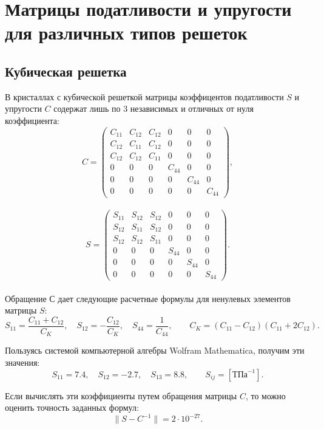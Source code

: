 \documentclass[12pt,a4paper]{article}
\begin{document}
\newpage

\section{Матрицы податливости и упругости для различных типов решеток}

\subsection{Кубическая решетка}

В кристаллах с кубической решеткой матрицы коэффицентов податливости $S$ и упругости $C$ содержат лишь по $3$ независимых и отличных от нуля коэффициента:
\[
    C=
    \begin{pmatrix}
    C_{11} & C_{12} & C_{12} & 0 & 0 & 0\\
    C_{12} & C_{11} & C_{12} & 0 & 0 & 0\\
    C_{12} & C_{12} & C_{11} & 0 & 0 & 0\\
    0 & 0 & 0 & C_{44} & 0 & 0\\
    0 & 0 & 0 & 0 & C_{44} & 0\\
    0 & 0 & 0 & 0 & 0 & C_{44} 
    \end{pmatrix},  
\]
\\
\[
    S=
    \begin{pmatrix}
    S_{11} & S_{12} & S_{12} & 0 & 0 & 0\\
    S_{12} & S_{11} & S_{12} & 0 & 0 & 0\\
    S_{12} & S_{12} & S_{11} & 0 & 0 & 0\\
    0 & 0 & 0 & S_{44} & 0 & 0\\
    0 & 0 & 0 & 0 & S_{44} & 0\\
    0 & 0 & 0 & 0 & 0 & S_{44} 
    \end{pmatrix}.  
\]
\\
Обращение $С$ дает следующие расчетные формулы для ненулевых элементов матрицы $S\colon$
\[
    S_{11}=\frac{C_{11}+C_{12}}{C_K}, \quad S_{12}=-\frac{C_{12}}{C_K}, \quad S_{44}=\frac{1}{C_{44}}, \qquad C_K=(C_{11}-C_{12})(C_{11}+2C_{12}).  
\]

Пользуясь системой компьютерной алгебры Wolfram Mathematica, получим эти значения:
\[
    S_{11} = 7.4, \quad S_{12} = -2.7, \quad S_{13} = 8.8, \qquad S_{ij} = [\text{ТПа}^{-1}].
\]

Если вычислять эти коэффициенты путем обращения матрицы $C$, то можно оценить точность заданных формул:
\[
  \| S - C^{-1} \|  = 2 \cdot 10^{-27}.
\]
\end{document}
